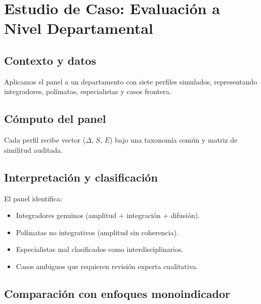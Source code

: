 \documentclass[
]{article}
\providecommand{\tightlist}{%
  \setlength{\itemsep}{0pt}\setlength{\parskip}{0pt}}
\begin{document}
\hypertarget{estudio-de-caso-evaluaciuxf3n-a-nivel-departamental}{%
\section{Estudio de Caso: Evaluación a Nivel
Departamental}\label{estudio-de-caso-evaluaciuxf3n-a-nivel-departamental}}

\hypertarget{contexto-y-datos}{%
\subsection{Contexto y datos}\label{contexto-y-datos}}

Aplicamos el panel a un departamento con siete perfiles simulados,
representando integradores, polímatas, especialistas y casos frontera.

\hypertarget{cuxf3mputo-del-panel}{%
\subsection{Cómputo del panel}\label{cuxf3mputo-del-panel}}

Cada perfil recibe vector (\(\Delta\), \(S\), \(E\)) bajo una taxonomía
común y matriz de similitud auditada.

\hypertarget{interpretaciuxf3n-y-clasificaciuxf3n}{%
\subsection{Interpretación y
clasificación}\label{interpretaciuxf3n-y-clasificaciuxf3n}}

El panel identifica:

\begin{itemize}
\tightlist
\item
  Integradores genuinos (amplitud + integración + difusión).
\item
  Polímatas no integrativos (amplitud sin coherencia).
\item
  Especialistas mal clasificados como interdisciplinarios.
\item
  Casos ambiguos que requieren revisión experta cualitativa.
\end{itemize}

\hypertarget{comparaciuxf3n-con-enfoques-monoindicador}{%
\subsection{Comparación con enfoques
monoindicador}\label{comparaciuxf3n-con-enfoques-monoindicador}}
\end{document}

